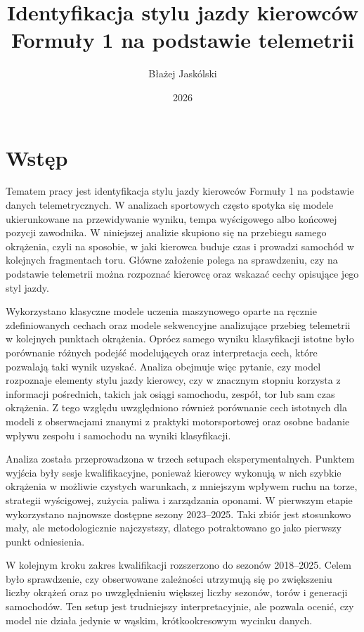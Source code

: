 \documentclass[printmode,pl]{mgr}
\author{Błażej Jaskólski}
\title{Identyfikacja stylu jazdy kierowców Formuły 1 na podstawie telemetrii}
\date{2026}
\begin{document}
\maketitle
\tableofcontents

\chapter{Wstęp}

Tematem pracy jest identyfikacja stylu jazdy kierowców Formuły 1 na podstawie danych telemetrycznych. W analizach sportowych często spotyka się modele ukierunkowane na przewidywanie wyniku, tempa wyścigowego albo końcowej pozycji zawodnika. W niniejszej analizie skupiono się na przebiegu samego okrążenia, czyli na sposobie, w jaki kierowca buduje czas i prowadzi samochód w kolejnych fragmentach toru. Główne założenie polega na sprawdzeniu, czy na podstawie telemetrii można rozpoznać kierowcę oraz wskazać cechy opisujące jego styl jazdy.

Wykorzystano klasyczne modele uczenia maszynowego oparte na ręcznie zdefiniowanych cechach oraz modele sekwencyjne analizujące przebieg telemetrii w kolejnych punktach okrążenia. Oprócz samego wyniku klasyfikacji istotne było porównanie różnych podejść modelujących oraz interpretacja cech, które pozwalają taki wynik uzyskać. Analiza obejmuje więc pytanie, czy model rozpoznaje elementy stylu jazdy kierowcy, czy w znacznym stopniu korzysta z informacji pośrednich, takich jak osiągi samochodu, zespół, tor lub sam czas okrążenia. Z tego względu uwzględniono również porównanie cech istotnych dla modeli z obserwacjami znanymi z praktyki motorsportowej oraz osobne badanie wpływu zespołu i samochodu na wyniki klasyfikacji.

Analiza została przeprowadzona w trzech setupach eksperymentalnych. Punktem wyjścia były sesje kwalifikacyjne, ponieważ kierowcy wykonują w nich szybkie okrążenia w możliwie czystych warunkach, z mniejszym wpływem ruchu na torze, strategii wyścigowej, zużycia paliwa i zarządzania oponami. W pierwszym etapie wykorzystano najnowsze dostępne sezony 2023--2025. Taki zbiór jest stosunkowo mały, ale metodologicznie najczystszy, dlatego potraktowano go jako pierwszy punkt odniesienia.

W kolejnym kroku zakres kwalifikacji rozszerzono do sezonów 2018--2025. Celem było sprawdzenie, czy obserwowane zależności utrzymują się po zwiększeniu liczby okrążeń oraz po uwzględnieniu większej liczby sezonów, torów i generacji samochodów. Ten setup jest trudniejszy interpretacyjnie, ale pozwala ocenić, czy model nie działa jedynie w wąskim, krótkookresowym wycinku danych.
\end{document}
